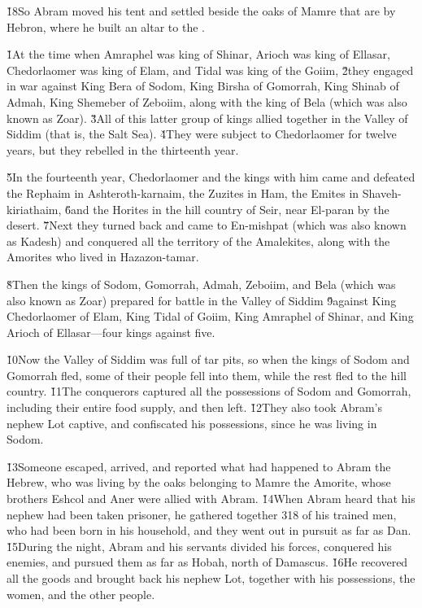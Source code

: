 \v{18}So Abram moved his tent and settled beside the oaks of Mamre that are by Hebron, where he built an altar to the .

\v{1}At the time when Amraphel was king of Shinar, Arioch was king of Ellasar, Chedorlaomer was king of Elam, and Tidal was king of the Goiim, \v{2}they engaged in war against King Bera of Sodom, King Birsha of Gomorrah, King Shinab of Admah, King Shemeber of Zeboiim, along with the king of Bela (which was also known as Zoar). \v{3}All of this latter group of kings allied together in the Valley of Siddim (that is, the Salt Sea). \v{4}They were subject to Chedorlaomer for twelve years, but they rebelled in the thirteenth year.

\v{5}In the fourteenth year, Chedorlaomer and the kings with him came and defeated the Rephaim in Ashteroth-karnaim, the Zuzites in Ham, the Emites in Shaveh-kiriathaim, \v{6}and the Horites in the hill country of Seir, near El-paran by the desert. \v{7}Next they turned back and came to En-mishpat (which was also known as Kadesh) and conquered all the territory of the Amalekites, along with the Amorites who lived in Hazazon-tamar.

\v{8}Then the kings of Sodom, Gomorrah, Admah, Zeboiim, and Bela (which was also known as Zoar) prepared for battle in the Valley of Siddim \v{9}against King Chedorlaomer of Elam, King Tidal of Goiim, King Amraphel of Shinar, and King Arioch of Ellasar---four kings against five.

\v{10}Now the Valley of Siddim was full of tar pits, so when the kings of Sodom and Gomorrah fled, some of their people fell into them, while the rest fled to the hill country. \v{11}The conquerors captured all the possessions of Sodom and Gomorrah, including their entire food supply, and then left. \v{12}They also took Abram's nephew Lot captive, and confiscated his possessions, since he was living in Sodom.

\v{13}Someone escaped, arrived, and reported what had happened to Abram the Hebrew, who was living by the oaks belonging to Mamre the Amorite, whose brothers Eshcol and Aner were allied with Abram. \v{14}When Abram heard that his nephew had been taken prisoner, he gathered together 318 of his trained men, who had been born in his household, and they went out in pursuit as far as Dan. \v{15}During the night, Abram and his servants divided his forces, conquered his enemies, and pursued them as far as Hobah, north of Damascus. \v{16}He recovered all the goods and brought back his nephew Lot, together with his possessions, the women, and the other people.

